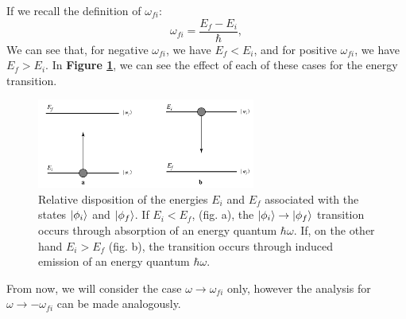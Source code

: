 If we recall the definition of $\omega_{fi}$:
\begin{equation}
    \omega_{fi} = \frac{E_f - E_i}{\hbar},
\end{equation}
We can see that, for negative $\omega_{fi}$, we have $E_f< E_i$, and for positive $\omega_{fi}$, we have $E_f> E_i$. In \textbf{Figure \ref{fig:state_transitions}}, we can see the effect of each of these cases for the energy transition.
\begin{figure}[htbp]
    \centering
    \includegraphics[width=0.64\textwidth]{images/state_transitions.png}
    \caption{Relative disposition of the energies $E_i$ and $E_f$ associated with the states $\ket{\phi_i}$ and $\ket{\phi_f}$. If $E_i < E_f$, (fig. a), the $\ket{\phi_i} \to \ket{\phi_f}$ transition occurs through absorption of an energy quantum $\hbar \omega$. If, on the other hand $E_i> E_f$ (fig. b), the transition occurs through induced emission of an energy quantum $\hbar \omega$.}
    \label{fig:state_transitions}
\end{figure}

From now, we will consider the case $\omega \to \omega_{fi}$ only, however the analysis for $\omega \to- \omega_{fi}$ can be made analogously.

